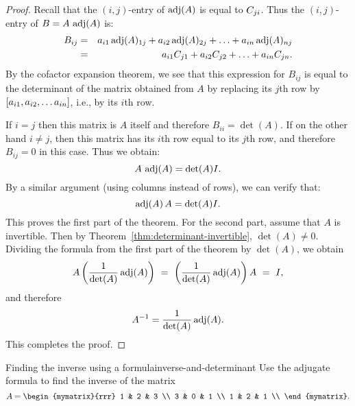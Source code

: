 \begin{proof}
  Recall that the $(i,j)$-entry of $\adj(A)$ is equal to
  $\cofactor{A}{ji}$.  Thus the $(i,j)$-entry of $B=A\,\adj(A)$ is:
  \begin{eqnarray*}
    B_{ij}
    &=& a_{i1}\adj(A)_{1j} + a_{i2}\adj(A)_{2j} + \ldots + a_{in}\adj(A)_{nj} \\
    &=& a_{i1}\cofactor{A}{j1} + a_{i2}\cofactor{A}{j2} + \ldots + a_{in}\cofactor{A}{jn}.
  \end{eqnarray*}
  By the cofactor expansion theorem, we see that this expression for
  $B_{ij}$ is equal to the determinant of the matrix obtained from $A$
  by replacing its $j$th row by $\mat{a_{i1}, a_{i2}, \dots a_{in}}$,
  i.e., by its $i$th row.

  If $i=j$ then this matrix is $A$ itself and therefore
  $B_{ii}=\det(A)$. If on the other hand $i\neq j$, then this matrix
  has its $i$th row equal to its $j$th row, and therefore $B_{ij}=0$
  in this case. Thus we obtain:
  \begin{equation*}
    A \, \adj(A) = {\det(A)} I.
  \end{equation*}
  By a similar argument (using columns instead of rows), we can verify that:
  \begin{equation*}
    \adj(A)\,A = {\det(A)} I.
  \end{equation*}
  This proves the first part of the theorem. For the second part,
  assume that $A$ is invertible. Then by
  Theorem~\ref{thm:determinant-invertible}, $\det(A)\neq 0$. Dividing the
  formula from the first part of the theorem by $\det(A)$, we obtain
  \begin{equation*}
    A\paren{\frac{1}{\det(A)}\adj(A)} ~=~ \paren{\frac{1}{\det(A)}\adj(A)}A ~=~ I,
  \end{equation*}
  and therefore
  \begin{equation*}
    A^{-1} = \frac{1}{\det(A)} \adj(A).
  \end{equation*}
  This completes the proof.
\end{proof}

\begin{example}{Finding the inverse using a formula}{inverse-and-determinant}
  Use the adjugate formula to find the inverse of the matrix
  \begin{equation*}
    A=\begin{mymatrix}{rrr}
      1 & 2 & 3 \\
      3 & 0 & 1 \\
      1 & 2 & 1 \\
    \end{mymatrix}.
  \end{equation*}
\end{example}

